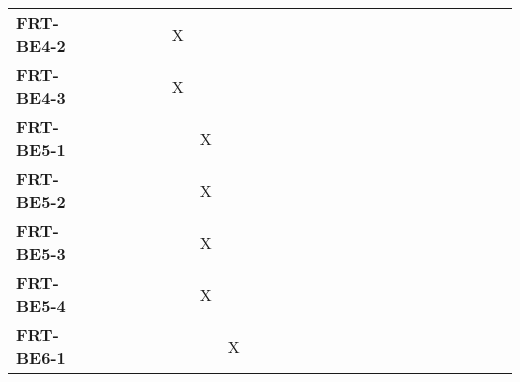 \documentclass[12pt, titlepage]{article}
\begin{document}
\begin{landscape}
\begin{longtable}{|l|ccccccccccccccccc|}
		\textbf{FRT-BE4-2}  & ~                                                         & ~            & ~            & X            & ~            & ~            & ~            & ~            & ~            & ~             & ~             & ~             & ~             & ~             & ~             & ~             & ~             \\
		\textbf{FRT-BE4-3}  & ~                                                         & ~            & ~            & X            & ~            & ~            & ~            & ~            & ~            & ~             & ~             & ~             & ~             & ~             & ~             & ~             & ~             \\
		\textbf{FRT-BE5-1}  & ~                                                         & ~            & ~            & ~            & X            & ~            & ~            & ~            & ~            & ~             & ~             & ~             & ~             & ~             & ~             & ~             & ~             \\
		\textbf{FRT-BE5-2}  & ~                                                         & ~            & ~            & ~            & X            & ~            & ~            & ~            & ~            & ~             & ~             & ~             & ~             & ~             & ~             & ~             & ~             \\
		\textbf{FRT-BE5-3}  & ~                                                         & ~            & ~            & ~            & X            & ~            & ~            & ~            & ~            & ~             & ~             & ~             & ~             & ~             & ~             & ~             & ~             \\
		\textbf{FRT-BE5-4}  & ~                                                         & ~            & ~            & ~            & X            & ~            & ~            & ~            & ~            & ~             & ~             & ~             & ~             & ~             & ~             & ~             & ~             \\
		\textbf{FRT-BE6-1}  & ~                                                         & ~            & ~            & ~            & ~            & X            & ~            & ~            & ~            & ~             & ~             & ~             & ~             & ~             & ~             & ~             & ~             \\

\end{longtable}
\end{landscape}
\end{document}
